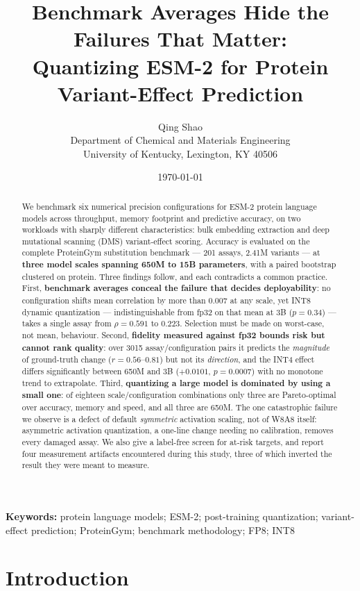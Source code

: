 \documentclass[11pt]{article}
\title{\textbf{Benchmark Averages Hide the Failures That Matter:\\
Quantizing ESM-2 for Protein Variant-Effect Prediction}}
\author{Qing Shao\\[2pt]
Department of Chemical and Materials Engineering\\
University of Kentucky, Lexington, KY 40506}
\date{\today}
\begin{document}
\maketitle

\begin{abstract}
\noindent
We benchmark six numerical precision configurations for ESM-2 protein language
models across throughput, memory footprint and predictive accuracy, on two
workloads with sharply different characteristics: bulk embedding extraction and
deep mutational scanning (DMS) variant-effect scoring. Accuracy is evaluated on
the complete ProteinGym substitution benchmark --- 201 assays, 2.41M variants
--- at \textbf{three model scales spanning 650M to 15B parameters}, with a
paired bootstrap clustered on protein. Three findings follow, and each
contradicts a common practice. First, \textbf{benchmark averages conceal the
failure that decides deployability}: no configuration shifts mean correlation by
more than $0.007$ at any scale, yet INT8 dynamic quantization ---
indistinguishable from fp32 on that mean at 3B ($p = 0.34$) --- takes a single
assay from $\rho = 0.591$ to $0.223$. Selection must be made on worst-case, not
mean, behaviour. Second, \textbf{fidelity measured against fp32 bounds risk but
cannot rank quality}: over 3015 assay/configuration pairs it predicts the
\emph{magnitude} of ground-truth change ($r = 0.56$--$0.81$) but not its
\emph{direction}, and the INT4 effect differs significantly between 650M and 3B
($+0.0101$, $p = 0.0007$) with no monotone trend to extrapolate. Third,
\textbf{quantizing a large model is dominated by using a small one}: of eighteen
scale/configuration combinations only three are Pareto-optimal over accuracy,
memory and speed, and all three are 650M. The one catastrophic failure we
observe is a defect of default \emph{symmetric} activation scaling, not of W8A8
itself: asymmetric activation quantization, a one-line change needing no
calibration, removes every damaged assay. We also give a label-free screen for
at-risk targets, and report four measurement artifacts encountered during this
study, three of which inverted the result they were meant to measure.
\end{abstract}

\noindent
\textbf{Keywords:} protein language models; ESM-2; post-training quantization;
variant-effect prediction; ProteinGym; benchmark methodology; FP8; INT8

\section{Introduction}
\end{document}
